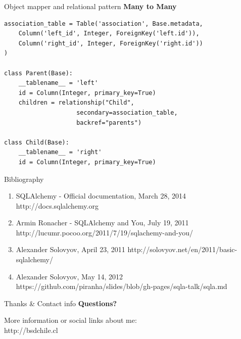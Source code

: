 \documentclass[seagull]{beamer}
\begin{document}
\begin{frame}[fragile]{Object mapper and relational pattern}
\textbf{Many to Many}
\begin{verbatim}
association_table = Table('association', Base.metadata,
    Column('left_id', Integer, ForeignKey('left.id')),
    Column('right_id', Integer, ForeignKey('right.id'))
)

class Parent(Base):
    __tablename__ = 'left'
    id = Column(Integer, primary_key=True)
    children = relationship("Child",
                    secondary=association_table,
                    backref="parents")

class Child(Base):
    __tablename__ = 'right'
    id = Column(Integer, primary_key=True)
\end{verbatim}
\end{frame}

\begin{frame}{Bibliography}
\begin{enumerate}
\item SQLAlchemy - Official documentation, March 28, 2014 http://docs.sqlalchemy.org
\item Armin Ronacher - SQLAlchemy and You, July 19, 2011 http://lucumr.pocoo.org/2011/7/19/sqlachemy-and-you/
\item Alexander Solovyov, April 23, 2011 http://solovyov.net/en/2011/basic-sqlalchemy/
\item Alexander Solovyov, May 14, 2012 https://github.com/piranha/slides/blob/gh-pages/sqla-talk/sqla.md
\end{enumerate}
\end{frame}

\begin{frame}{Thanks \& Contact info}
\centering\textbf{Questions?}
\\
\begin{small}
More information or social links about me:\\
http://bsdchile.cl
\end{small}
\end{frame}

\end{document}
